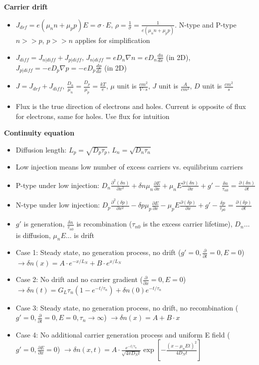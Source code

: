 \documentclass{article}
\begin{document}
\textbf{Carrier drift}
\begin{itemize}
    \item $J_{drf} = e(\mu_n n + \mu_p p)E = \sigma \cdot E$, $\rho = \frac{1}{\sigma} = \frac{1}{e(\mu_n n + \mu_p p)}$. N-type and P-type $n >> p$, $p >> n$ applies for simplification
    \item $J_{diff} = J_{n|diff} + J_{p|diff}$, $J_{n|diff} = e D_n \nabla{n} = e D_n \frac{dn}{dx}$ (in 2D), $J_{p|diff} = -e D_p \nabla{p} = -e D_p \frac{dp}{dx}$ (in 2D)
    \item $J = J_{drf} + J_{diff}$, $\frac{D_n}{\mu_n} = \frac{D_p}{\mu_p} = \frac{kT}{e}$, $\mu$ unit is $\frac{cm^2}{V \cdot s}$, $J$ unit is $\frac{A}{cm^2}$, $D$ unit is $\frac{cm^2}{s}$
    \item Flux is the true direction of electrons and holes. Current is opposite of flux for electrons, same for holes. Use flux for intuition
\end{itemize}
\textbf{Continuity equation}
\begin{itemize}
    \item Diffusion length: $L_p = \sqrt{D_p \tau_p}$, $L_n = \sqrt{D_n \tau_n}$
    \item Low injection means low number of excess carriers vs. equilibrium carriers
    \item P-type under low injection: $D_n \frac{\partial^2(\delta n)}{\partial x^2} + \delta n \mu_n \frac{\partial E}{\partial x} + \mu_n E \frac{\partial (\delta n)}{\partial x} + g' - \frac{\delta n}{\tau_{n0}} = \frac{\partial (\delta n)}{\partial t}$
    \item N-type under low injection: $D_p \frac{\partial^2(\delta p)}{\partial x^2} - \delta p \mu_p \frac{\partial E}{\partial x} - \mu_p E \frac{\partial (\delta p)}{\partial x} + g' - \frac{\delta p}{\tau_{p0}} = \frac{\partial (\delta p)}{\partial t}$
    \item $g'$ is generation, $\frac{\delta n}{\tau_{n0}}$ is recombination ($\tau_{n0}$ is the excess carrier lifetime), $D_n \dots$ is diffusion, $\mu_n E \dots$ is drift
    \item Case 1: Steady state, no generation process, no drift ($g' = 0, \frac{\partial}{\partial t} = 0, E = 0$) $\rightarrow \delta n(x) = A \cdot e^{-x/L_N} + B \cdot e^{x/L_N}$
    \item Case 2: No drift and no carrier gradient ($\frac{\partial}{\partial x} = 0, E = 0$) $\rightarrow \delta n(t) = G_L \tau_n \left(1 - e^{-t/\tau_n}\right) + \delta n(0) e^{-t/\tau_n}$
    \item Case 3: Steady state, no generation process, no drift, no recombination ($g' = 0, \frac{\partial}{\partial t} = 0, E = 0, \tau_n \rightarrow \infty$) $\rightarrow \delta n(x) = A + B \cdot x$
    \item Case 4: No additional carrier generation process and uniform E field ($g' = 0, \frac{\partial E}{\partial x} = 0$) $\rightarrow \delta n(x, t) = A \cdot \frac{e^{-t/\tau_n}}{\sqrt{4 \pi D_N t}} \exp\left[- \frac{\left(x - \mu_n E t\right)^2}{4 D_N t}\right]$
\end{itemize}
\end{document}

